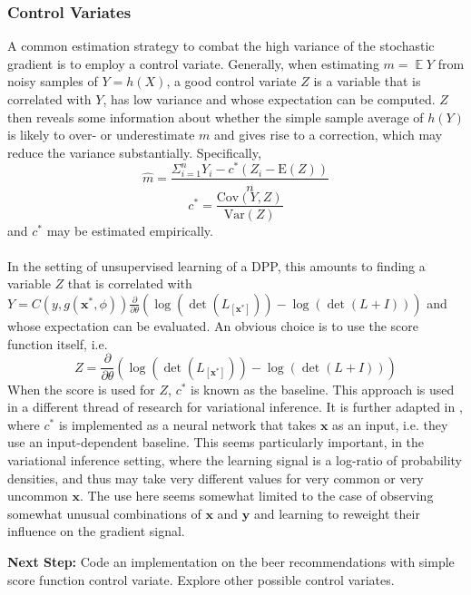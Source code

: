 \documentclass[12pt, oneside]{article}   	%
\newcommand{\E}{\mathrm{E}}
\newcommand{\Var}{\mathrm{Var}}
\newcommand{\Cov}{\mathrm{Cov}}
\begin{document}
\subsubsection*{Control Variates}
A common estimation strategy to combat the high variance of the stochastic gradient is to employ a control variate. Generally, when estimating $m = \mathop{\mathbb{E}}Y$ from noisy samples of $Y = h(X)$,  a good control variate $Z$ is a variable that is correlated with $Y$, has low variance and whose expectation can be computed. $Z$ then reveals some information about whether the simple sample average of $h(Y)$ is likely to over- or underestimate $m$ and gives rise to a correction, which may reduce the variance substantially. Specifically, 
\begin{equation}
\hat{m} = \frac{\Sigma_{i=1}^{n}Y_i-c^*(Z_i-\E(Z))}{n}
\end{equation}
\begin{equation}
c^* = \frac{\Cov(Y,Z)}{\Var(Z)}
\end{equation}
and $c^*$ may be estimated empirically. 
\\
\\
In the setting of unsupervised learning of a DPP, this amounts to finding a variable $Z$ that is correlated with $Y=C(y, g(\textbf{x}^*, \phi))\frac{\partial}{\partial \theta}(\log(\det(L_{[\textbf{x}^*]}))-\log(\det(L+I)))$ and whose expectation can be evaluated. An obvious choice is to use the score function itself, i.e. 
\begin{equation}
Z = \frac{\partial}{\partial \theta}(\log(\det(L_{[\textbf{x}^*]}))-\log(\det(L+I)))
\end{equation}
When the score is used for $Z$, $c^*$ is known as the baseline. This approach is used in a different thread of research for variational inference. \cite{blackboxvar} It is further adapted in \cite{DBLP:journals/corr/MnihG14}, where $c^*$ is implemented as a neural network that takes $\textbf{x}$ as an input, i.e. they use an input-dependent baseline. This seems particularly important, in the variational inference setting, where the learning signal is a log-ratio of probability densities, and thus may take very different values for very common or very uncommon $\textbf{x}$. The use here seems somewhat limited to the case of observing somewhat unusual combinations of $\textbf{x}$ and $\textbf{y}$ and learning to reweight their influence on the gradient signal.  

\textbf{Next Step:} Code an implementation on the beer recommendations with simple score function control variate. Explore other possible control variates. 
\end{document}
